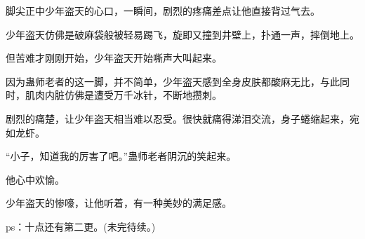 \begin{this_body}
脚尖正中少年盗天的心口，一瞬间，剧烈的疼痛差点让他直接背过气去。

少年盗天仿佛是破麻袋般被轻易踢飞，旋即又撞到井壁上，扑通一声，摔倒地上。

但苦难才刚刚开始，少年盗天开始嘶声大叫起来。

因为蛊师老者的这一脚，并不简单，少年盗天感到全身皮肤都酸麻无比，与此同时，肌肉内脏仿佛是遭受万千冰针，不断地攒刺。

剧烈的痛楚，让少年盗天相当难以忍受。很快就痛得涕泪交流，身子蜷缩起来，宛如龙虾。

“小子，知道我的厉害了吧。”蛊师老者阴沉的笑起来。

他心中欢愉。

少年盗天的惨嚎，让他听着，有一种美妙的满足感。

ps：十点还有第二更。(未完待续。)

\end{this_body}

